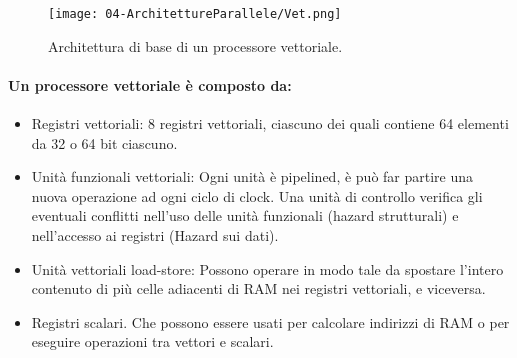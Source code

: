 

\begin{figure}[h]
    \centering
    \texttt{[image: 04-ArchitettureParallele/Vet.png]}
    \caption{Architettura di base di un processore vettoriale.}
\end{figure}

\paragraph{Un processore vettoriale è composto da:}

\begin{itemize}
  \item Registri vettoriali: 8 registri vettoriali, ciascuno dei quali contiene 64 elementi da 32 o 64 bit ciascuno. 
  \item Unità funzionali vettoriali: Ogni unità è pipelined, è può far
partire una nuova operazione ad ogni ciclo di clock. Una unità di
controllo verifica gli eventuali conflitti nell’uso delle unità
funzionali (hazard strutturali) e nell’accesso ai registri (Hazard sui
dati). 
\item Unità vettoriali load-store: Possono operare in modo tale da
spostare l’intero contenuto di più celle adiacenti di RAM nei
registri vettoriali, e viceversa.
\item Registri scalari. Che possono essere usati per calcolare indirizzi di
RAM o per eseguire operazioni tra vettori e scalari.
\end{itemize}



